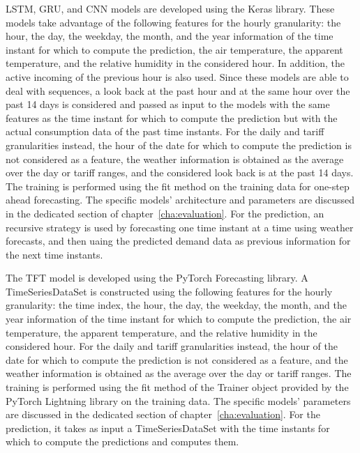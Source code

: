 LSTM, GRU, and CNN models are developed using the Keras library.
These models take advantage of the following features for the hourly granularity: the hour, the day, the weekday, the month, and the year information of the time instant for which to compute the prediction, the air temperature, the apparent temperature, and the relative humidity in the considered hour.
In addition, the active incoming of the previous hour is also used.
Since these models are able to deal with sequences, a look back at the past hour and at the same hour over the past 14 days is considered and passed as input to the models with the same features as the time instant for which to compute the prediction but with the actual consumption data of the past time instants.
For the daily and tariff granularities instead, the hour of the date for which to compute the prediction is not considered as a feature, the weather information is obtained as the average over the day or tariff ranges, and the considered look back is at the past 14 days.
The training is performed using the fit method on the training data for one-step ahead forecasting.
The specific models' architecture and parameters are discussed in the dedicated section of chapter~\ref{cha:evaluation}.
For the prediction, an recursive strategy is used by forecasting one time instant at a time using weather forecasts, and then uaing the predicted demand data as previous information for the next time instants.

The TFT model is developed using the PyTorch Forecasting library.
A TimeSeriesDataSet is constructed using the following features for the hourly granularity: the time index, the hour, the day, the weekday, the month, and the year information of the time instant for which to compute the prediction, the air temperature, the apparent temperature, and the relative humidity in the considered hour.
For the daily and tariff granularities instead, the hour of the date for which to compute the prediction is not considered as a feature, and the weather information is obtained as the average over the day or tariff ranges.
The training is performed using the fit method of the Trainer object provided by the PyTorch Lightning library on the training data.
The specific models' parameters are discussed in the dedicated section of chapter~\ref{cha:evaluation}.
For the prediction, it takes as input a TimeSeriesDataSet with the time instants for which to compute the predictions and computes them.

